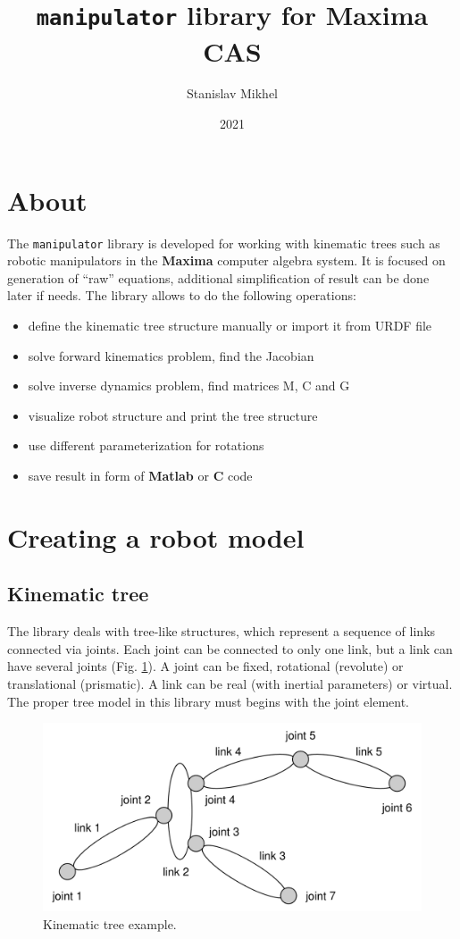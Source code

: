 \documentclass{article}
\title{\texttt{manipulator} library for \textbf{Maxima} CAS}
\author{Stanislav Mikhel}
\date{2021}
\begin{document}
\maketitle

\section{About} 

The \texttt{manipulator} library is developed for working with kinematic trees such as robotic manipulators in the \textbf{Maxima} computer algebra system. It is focused on generation of ``raw'' equations, additional simplification of result can be done later if needs. The library allows to do the following operations: 
\begin{itemize}
    \item define the kinematic tree structure manually or import it from URDF file 
    \item solve forward kinematics problem, find the Jacobian 
    \item solve inverse dynamics problem, find matrices M, C and G 
    \item visualize robot structure and print the tree structure 
    \item use different parameterization for rotations
    \item save result in form of \textbf{Matlab} or \textbf{C} code
\end{itemize}

\section{Creating a robot model} 

\subsection{Kinematic tree} 

The library deals with tree-like structures, which represent a sequence of links connected via joints. Each joint can be connected to only one link, but a link can have several joints (Fig. \ref{fig:kinematic_tree}). A joint can be fixed, rotational (revolute) or translational (prismatic). A link can be real (with inertial parameters) or virtual.  The proper tree model in this library must begins with the joint element. 

\begin{figure}[t]
    \centering
    \includegraphics[width=0.8\linewidth]{img/tree_struct.png}
    \caption{Kinematic tree example.}
    \label{fig:kinematic_tree}
\end{figure}
\end{document}
